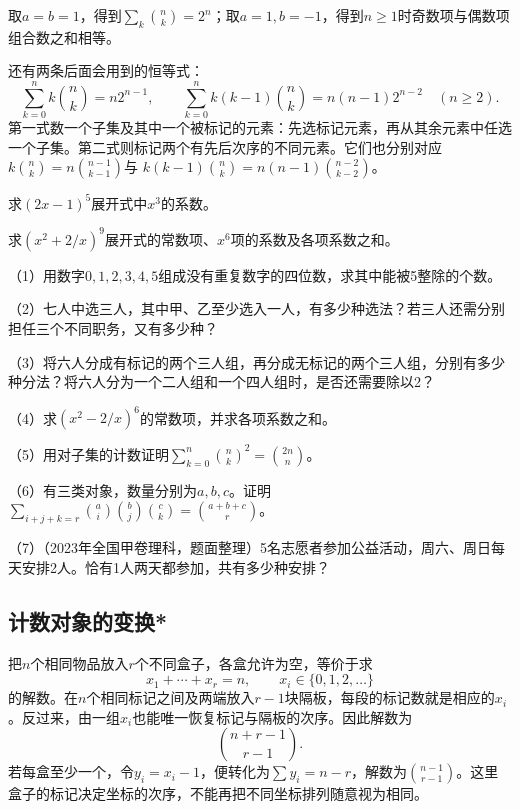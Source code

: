 取\(a=b=1\)，得到\(\sum_k\binom nk=2^n\)；取\(a=1,b=-1\)，得到\(n\ge1\)时奇数项与偶数项组合数之和相等。

还有两条后面会用到的恒等式：
\begin{equation}\label{eq:prob-binomial-moments}
 \sum_{k=0}^n k\binom nk=n2^{n-1},\qquad
 \sum_{k=0}^n k(k-1)\binom nk=n(n-1)2^{n-2}\quad(n\ge2).
\end{equation}
第一式数一个子集及其中一个被标记的元素：先选标记元素，再从其余元素中任选一个子集。第二式则标记两个有先后次序的不同元素。它们也分别对应
\(k\binom nk=n\binom{n-1}{k-1}\)与
\(k(k-1)\binom nk=n(n-1)\binom{n-2}{k-2}\)。

\begin{example}
求\((2x-1)^5\)展开式中\(x^3\)的系数。
\end{example}

\begin{example}
求\((x^2+2/x)^9\)展开式的常数项、\(x^6\)项的系数及各项系数之和。
\end{example}

\begin{exercise}
\mbox{}\par\nobreak

（1）用数字\(0,1,2,3,4,5\)组成没有重复数字的四位数，求其中能被5整除的个数。

（2）七人中选三人，其中甲、乙至少选入一人，有多少种选法？若三人还需分别担任三个不同职务，又有多少种？

（3）将六人分成有标记的两个三人组，再分成无标记的两个三人组，分别有多少种分法？将六人分为一个二人组和一个四人组时，是否还需要除以2？

（4）求\((x^2-2/x)^6\)的常数项，并求各项系数之和。

（5）用对子集的计数证明\(\sum_{k=0}^n\binom nk^2=\binom{2n}n\)。

（6）有三类对象，数量分别为\(a,b,c\)。证明\(\sum_{i+j+k=r}\binom ai\binom bj\binom ck=\binom{a+b+c}r\)。

（7）（2023年全国甲卷理科，题面整理）5名志愿者参加公益活动，周六、周日每天安排2人。恰有1人两天都参加，共有多少种安排？
\end{exercise}

\FloatBarrier
\newpage
\subsection{计数对象的变换*}

把\(n\)个相同物品放入\(r\)个不同盒子，各盒允许为空，等价于求
\[
 x_1+\cdots+x_r=n,\qquad x_i\in\{0,1,2,\ldots\}
\]
的解数。在\(n\)个相同标记之间及两端放入\(r-1\)块隔板，每段的标记数就是相应的\(x_i\)。反过来，由一组\(x_i\)也能唯一恢复标记与隔板的次序。因此解数为
\[
 \binom{n+r-1}{r-1}.
\]
若每盒至少一个，令\(y_i=x_i-1\)，便转化为\(\sum y_i=n-r\)，解数为\(\binom{n-1}{r-1}\)。这里盒子的标记决定坐标的次序，不能再把不同坐标排列随意视为相同。

